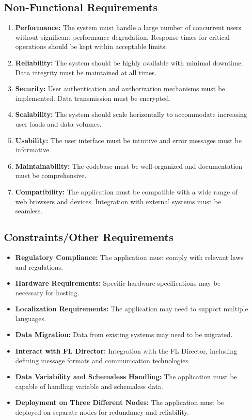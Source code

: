 \subsection{Non-Functional Requirements}

\begin{enumerate}
    \item \textbf{Performance:} The system must handle a large number of concurrent users without significant performance degradation. Response times for critical operations should be kept within acceptable limits.
    \item \textbf{Reliability:} The system should be highly available with minimal downtime. Data integrity must be maintained at all times.
    \item \textbf{Security:} User authentication and authorization mechanisms must be implemented. Data transmission must be encrypted.
    \item \textbf{Scalability:} The system should scale horizontally to accommodate increasing user loads and data volumes.
    \item \textbf{Usability:} The user interface must be intuitive and error messages must be informative.
    \item \textbf{Maintainability:} The codebase must be well-organized and documentation must be comprehensive.
    \item \textbf{Compatibility:} The application must be compatible with a wide range of web browsers and devices. Integration with external systems must be seamless.
\end{enumerate}

\subsection{Constraints/Other Requirements}

\begin{itemize}
    \item \textbf{Regulatory Compliance:} The application must comply with relevant laws and regulations.
    \item \textbf{Hardware Requirements:} Specific hardware specifications may be necessary for hosting.
    \item \textbf{Localization Requirements:} The application may need to support multiple languages.
    \item \textbf{Data Migration:} Data from existing systems may need to be migrated.
    \item \textbf{Interact with FL Director:} Integration with the FL Director, including defining message formats and communication technologies.
    \item \textbf{Data Variability and Schemaless Handling:} The application must be capable of handling variable and schemaless data.
    \item \textbf{Deployment on Three Different Nodes:} The application must be deployed on separate nodes for redundancy and reliability.
\end{itemize}

